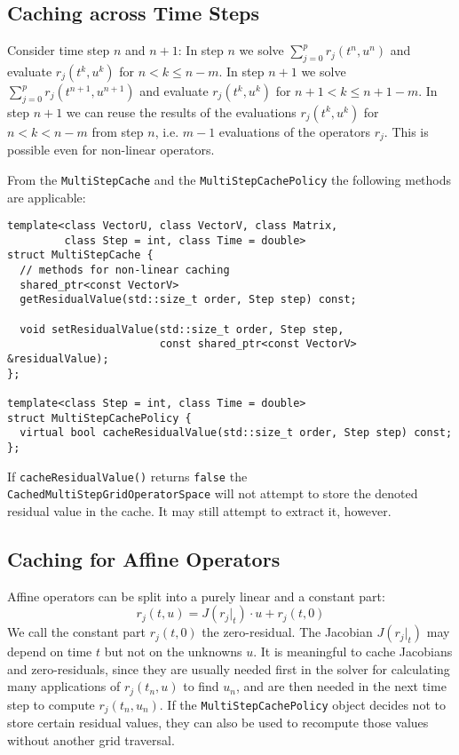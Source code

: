 \documentclass[11pt,a4paper,DIV11,%
notitlepage,oneside,abstracton,%
bibtotoc]{scrartcl}
\begin{document}
\subsection{Caching across Time Steps}

Consider time step $n$ and $n+1$: In step $n$ we solve
$\sum_{j=0}^pr_j(t^n,u^n)$ and evaluate $r_j(t^k,u^k)$ for $n<k\leq n-m$.  In
step $n+1$ we solve $\sum_{j=0}^pr_j(t^{n+1},u^{n+1})$ and evaluate
$r_j(t^k,u^k)$ for $n+1<k\leq n+1-m$.  In step $n+1$ we can reuse the results
of the evaluations $r_j(t^k,u^k)$ for $n<k<n-m$ from step $n$, i.e. $m-1$
evaluations of the operators $r_j$.  This is possible even for non-linear
operators.

From the {\tt MultiStepCache} and the {\tt MultiStepCachePolicy} the following
methods are applicable:
\begin{lstlisting}
template<class VectorU, class VectorV, class Matrix,
         class Step = int, class Time = double>
struct MultiStepCache {
  // methods for non-linear caching
  shared_ptr<const VectorV>
  getResidualValue(std::size_t order, Step step) const;

  void setResidualValue(std::size_t order, Step step,
                        const shared_ptr<const VectorV> &residualValue);
};

template<class Step = int, class Time = double>
struct MultiStepCachePolicy {
  virtual bool cacheResidualValue(std::size_t order, Step step) const;
};
\end{lstlisting}
If {\tt cacheResidualValue()} returns {\tt false} the {\tt
  Cached\-Multi\-Step\-Grid\-Operator\-Space} will not attempt to store the
denoted residual value in the cache.  It may still attempt to extract it,
however.

\subsection{Caching for Affine Operators}

Affine operators can be split into a purely linear and a constant part:
\begin{equation}
  r_j(t,u)=J(r_j|_t)\cdot u+r_j(t,0)
\end{equation}
We call the constant part $r_j(t,0)$ the zero-residual.  The Jacobian
$J(r_j|_t)$ may depend on time $t$ but not on the unknowns $u$.  It is
meaningful to cache Jacobians and zero-residuals, since they are usually
needed first in the solver for calculating many applications of $r_j(t_n,u)$
to find $u_n$, and are then needed in the next time step to compute
$r_j(t_n,u_n)$.  If the {\tt MultiStepCachePolicy} object decides not to store
certain residual values, they can also be used to recompute those values
without another grid traversal.
\end{document}
